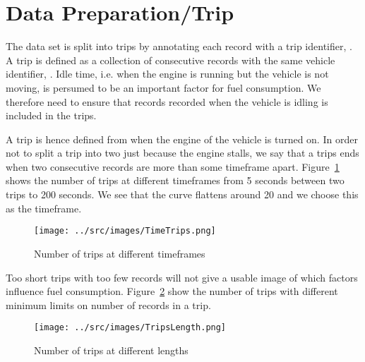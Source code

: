 \section{Data Preparation/Trip}\label{sec:trips}

The data set is split into trips by annotating each record with a trip identifier, \tid.
A trip is defined as a collection of consecutive records with the same vehicle identifier, \vid.
Idle time, i.e. when the engine is running but the vehicle is not moving, is persumed to be an important factor for fuel consumption. 
We therefore need to ensure that records recorded when the vehicle is idling is included in the trips. 

A trip is hence defined from when the engine of the vehicle is turned on.
In order not to split a trip into two just because the engine stalls, we say that a trips ends when two consecutive records are more than some timeframe apart.
Figure~\ref{fig:TimeTrips} shows the number of trips at different timeframes from 5 seconds between two trips to 200 seconds.
We see that the curve flattens around 20 and we choose this as the timeframe. 
\begin{figure}[htb]
\centering
\texttt{[image: ../src/images/TimeTrips.png]}
\caption{Number of trips at different timeframes}
\label{fig:TimeTrips}
\end{figure}

Too short trips with too few records will not give a usable image of which factors influence fuel consumption.
Figure~\ref{fig:LengthTrips} show the number of trips with different minimum limits on number of records in a trip.
\begin{figure}[htb]
\centering
\texttt{[image: ../src/images/TripsLength.png]}
\caption{Number of trips at different lengths}
\label{fig:LengthTrips}
\end{figure}